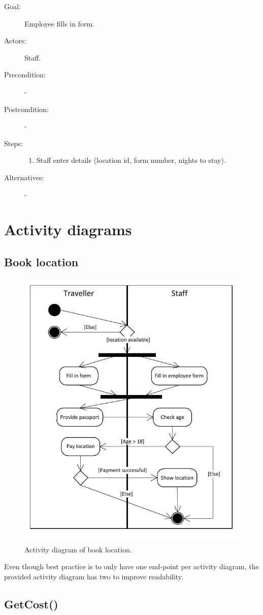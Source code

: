 \begin{description}
\item[Goal:] Employee fills in form.
\item[Actors:] Staff.
\item[Precondition:] -
\item[Postcondition:] -
\item[Steps:] 
\begin{enumerate}
\item Staff enter details (location id, form number, nights to stay).
\end{enumerate}

\item[Alternatives:] -
\end{description}

\section{Activity diagrams}

\subsection{Book location}

\begin{figure}[H]
\begin{centering}
\includegraphics[width=\textwidth]{gfx/activity_diagram_book.pdf} 
\end{centering}
\caption{Activity diagram of book location.}
\label{fig:actdiag_book}
\end{figure}

Even though best practice is to only have one end-point per activity diagram, the provided activity diagram has two to improve readability.

\subsection{GetCost()}

